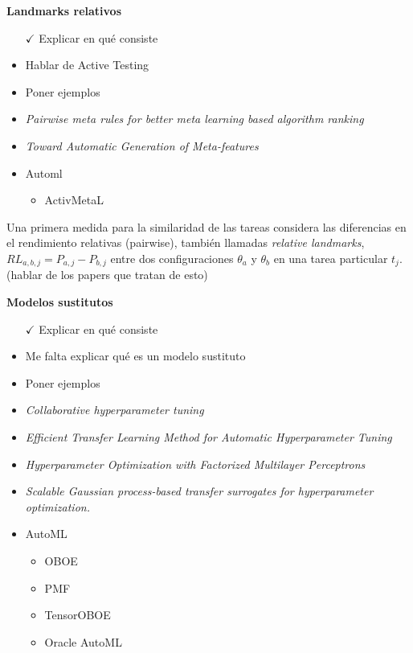 \quad 

\textbf{Landmarks relativos}

\begin{itemize}
	\item[$\checkmark$] Explicar en qué consiste
	\item Hablar de Active Testing
	\item Poner ejemplos
	\item \textit{Pairwise meta rules for better meta learning based algorithm ranking}
	\item \textit{Toward Automatic Generation of Meta-features}
	\item Automl \begin{itemize}
		\item ActivMetaL
	\end{itemize}
\end{itemize}

\quad

Una primera medida para la similaridad de las tareas considera las diferencias en el rendimiento relativas (pairwise), también llamadas \textit{relative landmarks}, $RL_{a,b,j} = P_{a,j} - P_{b,j}$ entre dos configuraciones $\theta_a$ y $\theta_b$ en una tarea particular $t_j$. (hablar de los papers que tratan de esto) 

\quad

\textbf{Modelos sustitutos}

\begin{itemize}
	\item[$\checkmark$] Explicar en qué consiste
	\item Me falta explicar qué es un modelo sustituto
	\item Poner ejemplos
	\item \textit{Collaborative hyperparameter tuning}
	\item \textit{Efficient Transfer Learning Method for Automatic Hyperparameter Tuning}
	\item \textit{Hyperparameter Optimization with Factorized Multilayer Perceptrons}
	\item \textit{Scalable Gaussian process-based transfer surrogates for hyperparameter optimization.}
	\item AutoML \begin{itemize}
		\item OBOE
		\item PMF
		\item TensorOBOE
		\item Oracle AutoML
	\end{itemize}
\end{itemize}

